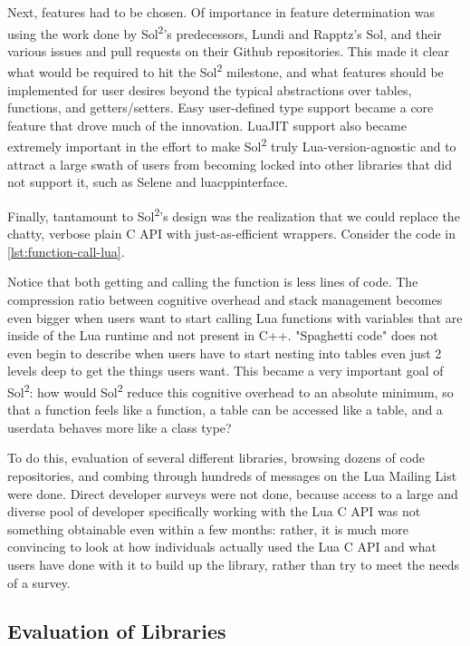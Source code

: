 \documentclass[conference,compsoc]{IEEEtran}
\newcommand{\soltwo}{Sol\textsuperscript{2}}
\begin{document}
Next, features had to be chosen. Of importance in feature determination was using the work done by \soltwo{}'s predecessors, Lundi and Rapptz's Sol, and their various issues and pull requests on their Github repositories. This made it clear what would be required to hit the \soltwo{} milestone, and what features should be implemented for user desires beyond the typical abstractions over tables, functions, and getters/setters. Easy user-defined type support became a core feature that drove much of the innovation. LuaJIT support also became extremely important in the effort to make \soltwo{} truly Lua-version-agnostic and to attract a large swath of users from becoming locked into other libraries that did not support it, such as Selene\cite{selene} and luacppinterface\cite{luacppinterface}.

Finally, tantamount to \soltwo{}'s design was the realization that we could replace the chatty, verbose plain C API with just-as-efficient wrappers. Consider the code in \cref{lst:function-call-lua}.

Notice that both getting and calling the function is less lines of code. The compression ratio between cognitive overhead and stack management becomes even bigger when users want to start calling Lua functions with variables that are inside of the Lua runtime and not present in C++. "Spaghetti code" does not even begin to describe when users have to start nesting into tables even just 2 levels deep to get the things users want. This became a very important goal of \soltwo{}: how would \soltwo{} reduce this cognitive overhead to an absolute minimum, so that a function feels like a function, a table can be accessed like a table, and a userdata behaves more like a class type?

To do this, evaluation of several different libraries, browsing dozens of code repositories, and combing through hundreds of messages on the Lua Mailing List were done. Direct developer surveys were not done, because access to a large and diverse pool of developer specifically working with the Lua C API was not something obtainable even within a few months: rather, it is much more convincing to look at how individuals actually used the Lua C API and what users have done with it to build up the library, rather than try to meet the needs of a survey\cite{these-goddamn-users}.

\subsection{Evaluation of Libraries}
\end{document}

